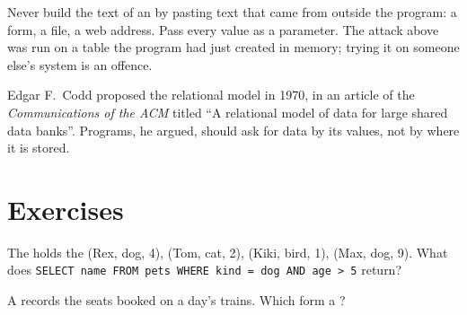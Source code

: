 \label{lst:g12:relational-databases-sql:injection}

\label{out:g12:relational-databases-sql:injection}

\begin{safety}
Never build the text of an   by pasting text that came from outside the program: a form, a file, a web
address. Pass every value as a parameter. The attack above was run on a table the program had just created in memory;
trying it on someone else's system is an offence.
\end{safety}

\begin{history}[Codd, 1970]
Edgar F.\ Codd proposed the relational model in 1970, in an article of the \emph{Communications of the ACM} titled
``A relational model of data for large shared data banks''. Programs, he argued, should ask for data by its values,
not by where it is stored.
\end{history}

\section{Exercises}\label{sec:g12:relational-databases-sql:exercises}

\begin{exercise}[$\star$]\label{exo:g12:relational-databases-sql:1}
The   holds the  (Rex, dog, 4), (Tom, cat, 2), (Kiki, bird, 1),
(Max, dog, 9). What does \texttt{SELECT name FROM pets WHERE kind = \textquotesingle{}dog\textquotesingle{} AND age > 5} return?
\end{exercise}

\begin{exercise}[$\star$]\label{exo:g12:relational-databases-sql:2}
A   records the seats booked on a day's trains. Which 
form a ?
\end{exercise}

